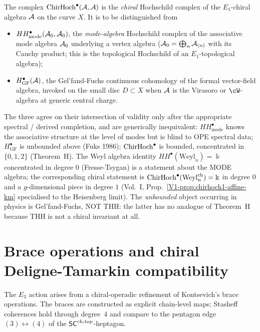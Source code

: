 \begin{remark}%
\label{rem:chd-three-hochschilds}%
%
The complex $\mathrm{ChirHoch}^\bullet(\mathcal{A}, \mathcal{A})$ is the
\emph{chiral} Hochschild complex of the $E_1$-chiral algebra $\mathcal{A}$ on
the curve $X$. It is to be distinguished from
\begin{itemize}
\item $HH^\bullet_{\mathrm{mode}}(\mathcal{A}_0, \mathcal{A}_0)$, the \emph{mode-algebra}
Hochschild complex of the associative mode algebra $\mathcal{A}_0$ underlying a
vertex algebra ($\mathcal{A}_0 = \bigoplus_n \mathcal{A}_{(n)}$ with its Cauchy product;
this is the topological Hochschild of an $E_1$-topological algebra);
\item $H^\bullet_{\mathrm{GF}}(\mathcal{A})$, the Gel'fand-Fuchs continuous
cohomology of the formal vector-field algebra, invoked on the small
disc $D \subset X$ when $\mathcal{A}$ is the Virasoro or $\cW$-algebra at
generic central charge.
\end{itemize}
The three agree on their intersection of validity only after the
appropriate spectral / derived completion, and are generically
inequivalent: $HH^\bullet_{\mathrm{mode}}$ knows the associative
structure at the level of modes but is blind to OPE spectral data;
$H^\bullet_{\mathrm{GF}}$ is unbounded above (Fuks 1986);
$\mathrm{ChirHoch}^\bullet$ is bounded, concentrated in $\{0,1,2\}$
(Theorem~H). The Weyl algebra identity $HH^\bullet(\mathrm{Weyl}_n)
= \Bbbk$ concentrated in degree $0$ (Fresse-Tsygan) is a statement
about the MODE algebra; the corresponding chiral statement is
$\mathrm{ChirHoch}^\bullet(\mathrm{Weyl}^{\mathrm{ch}}_n) = \Bbbk$ in degree
$0$ and a $g$-dimensional piece in degree $1$
(Vol.~I, Prop.~\ref*{V1-prop:chirhoch1-affine-km} specialised to the
Heisenberg limit). The \emph{unbounded} object occurring in physics is
Gel'fand-Fuchs, NOT THH: the latter has no analogue of Theorem~H
because THH is not a chiral invariant at all.
\end{remark}

\section{Brace operations and chiral Deligne-Tamarkin compatibility}
\label{sec:chd-braces}

The $E_3$ action arises from a chiral-operadic refinement of
Kontsevich's brace operations. The braces are constructed as
explicit chain-level maps; Stasheff coherences hold through
degree~$4$ and compare to the pentagon edge
$(3)\leftrightarrow(4)$ of the $\mathsf{SC}^{\mathrm{ch},\mathrm{top}}$-heptagon.


